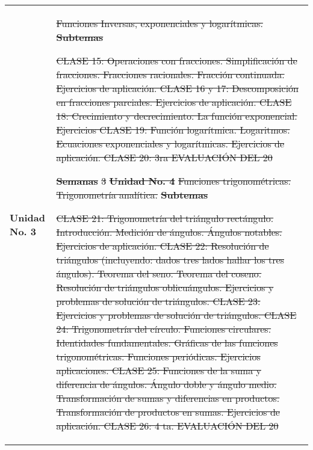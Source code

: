 \documentclass[11pt]{article}
\providecommand{\DIFdeltex}[1]{{\protect\color{red}\sout{#1}}}                      %
\providecommand{\DIFdelbegin}{} %
\providecommand{\DIFdel}[1]{\texorpdfstring{\DIFdeltex{#1}}{}} %
\newcommand{\DIFscaledelfig}{0.5}
\newlength{\DIFdelgraphicswidth} %
\newlength{\DIFdelgraphicsheight} %
\newcommand{\DIFdelincludegraphics}[2][]{%
\sbox{\DIFdelgraphicsbox}{\DIFOincludegraphics[#1]{#2}}%
\settoboxwidth{\DIFdelgraphicswidth}{\DIFdelgraphicsbox} %
\settoboxtotalheight{\DIFdelgraphicsheight}{\DIFdelgraphicsbox} %
\scalebox{\DIFscaledelfig}{%
\parbox[b]{\DIFdelgraphicswidth}{\usebox{\DIFdelgraphicsbox}\\[-\baselineskip] \rule{\DIFdelgraphicswidth}{0em}}\llap{\resizebox{\DIFdelgraphicswidth}{\DIFdelgraphicsheight}{%
\setlength{\unitlength}{\DIFdelgraphicswidth}%
\begin{picture}(1,1)%
\thicklines\linethickness{2pt} %
{\color[rgb]{1,0,0}\put(0,0){\framebox(1,1){}}}%
{\color[rgb]{1,0,0}\put(0,0){\line( 1,1){1}}}%
{\color[rgb]{1,0,0}\put(0,1){\line(1,-1){1}}}%
\end{picture}%
}\hspace*{3pt}}} %
} %
\DeclareRobustCommand{\DIFdelbegin}{\DIFOdelbegin \let\includegraphics\DIFdelincludegraphics} %
\begin{document}
 \\ 
 \begin{tabular}{R{0.16\textwidth} L{0.7\textwidth}} 
 \\ 
\toprule \textbf{Unidad No. 3} & \DIFdelbegin \DIFdel{Funciones Inversas, exponenciales y logarítmicas. 
 }%
\textbf{\DIFdel{Subtemas}} %
\begin{description}%
\item%
\DIFdel{CLASE 15: Operaciones con fracciones. Simplificación de fracciones. Fracciones racionales. Fracción continuada. Ejercicios de aplicación. CLASE 16 y 17: Descomposición en fracciones parciales. Ejercicios de aplicación. CLASE 18: Crecimiento y decrecimiento. La función exponencial. Ejercicios CLASE 19: Función logarítmica. Logaritmos. Ecuaciones exponenciales y logarítmicas. Ejercicios de aplicación. CLASE 20: 3ra EVALUACIÓN DEL 20%
}
\end{description}%
\textbf{\DIFdel{Semanas}} %
\DIFdel{3 
}%
\textbf{\DIFdel{Unidad No. 4}} %
\DIFdel{Funciones trigonométricas. Trigonometría analítica. 
 }%
\textbf{\DIFdel{Subtemas}} %
\begin{description}%
\item%
\DIFdel{CLASE 21: Trigonometría del triángulo rectángulo. Introducción. Medición de ángulos. Ángulos notables. Ejercicios de aplicación. CLASE 22: Resolución de triángulos (incluyendo: dados tres lados hallar los tres ángulos). Teorema del seno. Teorema del coseno. Resolución de triángulos oblicuángulos. Ejercicios y problemas de solución de triángulos. CLASE 23: Ejercicios y problemas de solución de triángulos. CLASE 24: Trigonometría del círculo. Funciones circulares. Identidades fundamentales. Gráficas de las funciones trigonométricas. Funciones periódicas. Ejercicios aplicaciones. CLASE 25: Funciones de la suma y diferencia de ángulos. Ángulo doble y ángulo medio. Transformación de sumas y diferencias en productos. Transformación de productos en sumas. Ejercicios de aplicación. CLASE 26: 4 ta. EVALUACIÓN DEL 20%
}
\end{description}
\end{tabular}
\end{document}
